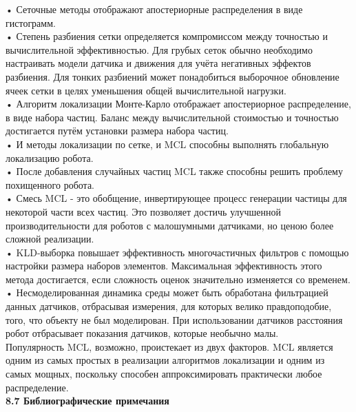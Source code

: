 \documentclass[10pt,a4paper]{article}
\begin{document}
•	Сеточные методы отображают апостериорные распределения в виде гистограмм.\\

•	Степень разбиения сетки определяется компромиссом между точностью и вычислительной эффективностью. Для грубых сеток обычно необходимо настраивать модели датчика и движения для учёта негативных эффектов разбиения. Для тонких разбиений может понадобиться выборочное обновление ячеек сетки в целях уменьшения общей вычислительной нагрузки.\\

•	Алгоритм локализации Монте-Карло отображает апостериорное распределение, в виде набора частиц. Баланс между вычислительной стоимостью и точностью достигается путём установки размера набора частиц. \\

•	И методы локализации по сетке, и MCL способны выполнять глобальную локализацию робота.\\

•	После добавления случайных частиц MCL также способны решить проблему похищенного робота.\\

•	Смесь MCL - это обобщение, инвертирующее процесс генерации частицы для некоторой части всех частиц. Это позволяет достичь улучшенной производительности для роботов с малошумными датчиками, но ценою более сложной реализации.\\

•	KLD-выборка повышает эффективность многочастичных фильтров с помощью настройки размера наборов элементов. Максимальная эффективность этого метода достигается, если сложность оценок значительно изменяется со временем.\\

•	Несмоделированная динамика среды может быть обработана фильтрацией данных датчиков, отбрасывая измерения, для которых велико правдоподобие, того, что объекту не был моделирован. При использовании датчиков расстояния робот отбрасывает показания датчиков, которые необычно малы.\\

Популярность MCL, возможно, проистекает из двух факторов. MCL является одним из самых простых в реализации алгоритмов локализации и одним из самых мощных, поскольку способен аппроксимировать практически любое распределение. \\

\textbf{8.7 Библиографические примечания}\\
\end{document}
